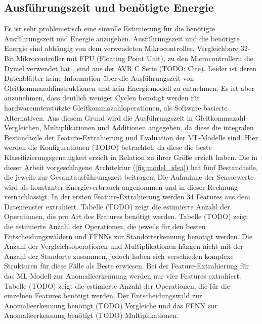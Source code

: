 \subsection{Ausführungszeit und benötigte Energie}
Es ist sehr problemetisch eine sinvolle Estimierung für die benötigte Ausführungszeit und Energie anzugeben.
Ausführungszeit und die benötigte Energie sind abhängig von dem verwendeten Mikrocontroller.
Vergleichbare 32-Bit Mikrocontroller mit FPU (Floating Point Unit), zu den Microcontrollern die Dymel verwendet hat \cite{dymelThesis}, sind aus der AVR C Serie (TODO: Cite).
Leider ist deren Datenblätter keine Information über die Ausführungszeit von Gleitkommazahlinstruktionen und kein Energiemodell zu entnehmen.
Es ist aber anzunehmen, dass deutlich weniger Cyclen benötigt werden für hardwareunterstützte Gleitkommazahloperationen, als Software basierte Alternativen.
Aus diesem Grund wird die Ausführungszeit in Gleitkommazahl- Vergleichen, Multiplikationen und Additionen angegeben,
da diese die integralen Bestandteile der Feature-Extrahierung und Evaluation der ML-Modelle sind.
\newline
\newline
Hier werden die Konfigurationen (TODO) betrachtet, da diese die beste Klassifizierungsgenauigkeit erzielt in Relation zu ihrer Größe erzielt haben.
Die in dieser Arbeit vorgeschlagene Architektur (\ref{fig:model_idea}) hat fünf Bestandteile, die jeweils zur Gesamtausführungszeit beitragen.
Die Aufnahme der Sensorwerte wird als konstanter Energieverbrauch angenommen und in dieser Rechnung vernachlässigt.
In der ersten Feature-Extrahierung werden 34 Features aus dem Datenfenster extrahiert.
Tabelle (TODO) zeigt die estimierte Anzahl der Operationen, die pro Art des Features benötigt werden.
\newline
\newline
Tabelle (TODO) zeigt die estimierte Anzahl der Operationen, die jeweils für den besten Entscheidungswäldern und FFNNs zur Standorterkennung benötigt werden.
Die Anzahl der Vergleichsoperationen und Multiplikationen hängen nicht mit der Anzahl der Standorte zusammen,
jedoch haben sich verschieden komplexe Strukturen für diese Fälle als Beste erwiesen.
\newline
\newline
Bei der Feature-Extrahierung für das ML-Modell zur Anomalieerkennung werden nur vier Features extrahiert.
Tabelle (TODO) zeigt die estimierte Anzahl der Operationen, die für die einzelnen Features benötigt werden.
Der Entscheidungswald zur Anomalieerkennung benötigt (TODO) Vergleiche und das FFNN zur Anomalieerkennung benötigt (TODO) Multiplikationen.
